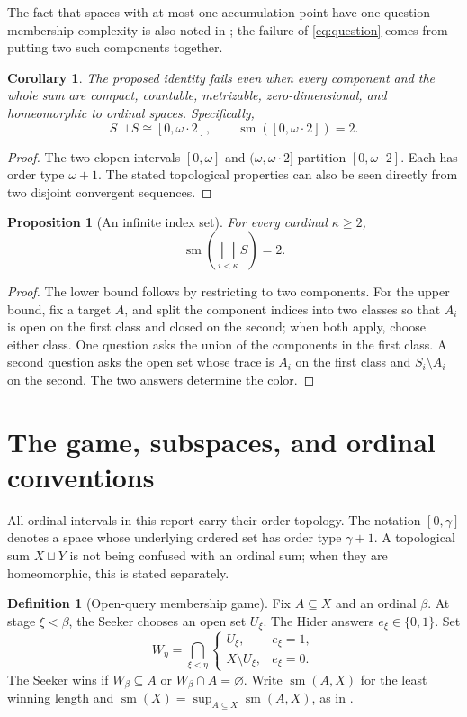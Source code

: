 \documentclass[11pt,letterpaper]{article}
\numberwithin{equation}{section}
\newtheorem{proposition}[proposition]{Proposition}
\newtheorem{corollary}[corollary]{Corollary}
\theoremstyle{definition}
\newtheorem{definition}[definition]{Definition}
\theoremstyle{remark}
\theoremstyle{definition}
\newcommand{\sm}{\operatorname{sm}}
\newcommand{\bigsqsum}{\bigsqcup}
\begin{document}
The fact that spaces with at most one accumulation point have one-question
membership complexity is also noted in \cite[Section 7]{CCS}; the failure of
\eqref{eq:question} comes from putting two such components together.

\begin{corollary}
The proposed identity fails even when every component and the whole sum are
compact, countable, metrizable, zero-dimensional, and homeomorphic to ordinal
spaces. Specifically,
\[
 S\sqcup S\cong[0,\omega\cdot2],
 \qquad \sm([0,\omega\cdot2])=2.
\]
\end{corollary}
\begin{proof}
The two clopen intervals $[0,\omega]$ and $(\omega,\omega\cdot2]$ partition
$[0,\omega\cdot2]$. Each has order type $\omega+1$. The stated topological
properties can also be seen directly from two disjoint convergent sequences.
\end{proof}

\begin{proposition}[An infinite index set]
For every cardinal $\kappa\geq2$,
\[
 \sm\!\left(\bigsqsum_{i<\kappa}S\right)=2.
\]
\end{proposition}
\begin{proof}
The lower bound follows by restricting to two components. For the upper bound,
fix a target $A$, and split the component indices into two classes so that $A_i$
is open on the first class and closed on the second; when both apply, choose
either class. One question asks the union of the components in the first class.
A second question asks the open set whose trace is $A_i$ on the first class and
$S_i\setminus A_i$ on the second. The two answers determine the color.
\end{proof}

\section{The game, subspaces, and ordinal conventions}

All ordinal intervals in this report carry their order topology. The notation
$[0,\gamma]$ denotes a space whose underlying ordered set has order type
$\gamma+1$. A topological sum $X\sqcup Y$ is not being confused with an ordinal
sum; when they are homeomorphic, this is stated separately.

\begin{definition}[Open-query membership game]
Fix $A\subseteq X$ and an ordinal $\beta$. At stage $\xi<\beta$, the Seeker
chooses an open set $U_\xi$. The Hider answers $e_\xi\in\{0,1\}$. Set
\[
 W_\eta=\bigcap_{\xi<\eta}
 \begin{cases}
  U_\xi,&e_\xi=1,\\
  X\setminus U_\xi,&e_\xi=0.
 \end{cases}
\]
The Seeker wins if $W_\beta\subseteq A$ or $W_\beta\cap A=\varnothing$.
Write $\sm(A,X)$ for the least winning length and
$\sm(X)=\sup_{A\subseteq X}\sm(A,X)$, as in \cite{CCS}.
\end{definition}
\end{document}

